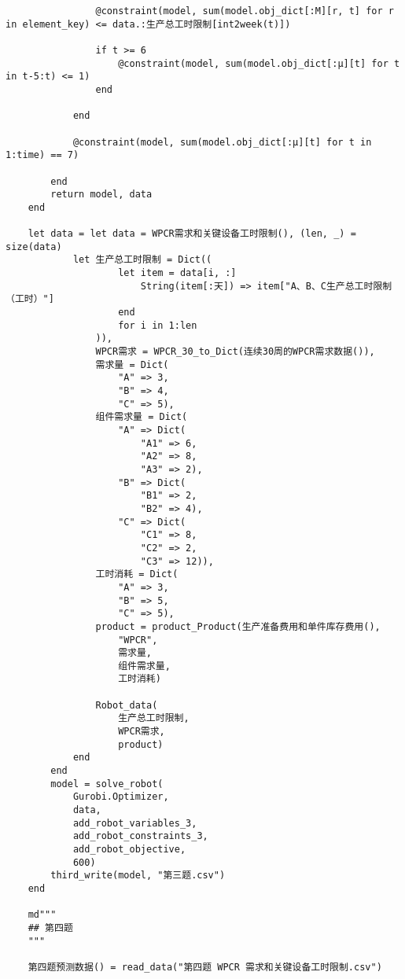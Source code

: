 \begin{appendices}
\begin{lstlisting}
                @constraint(model, sum(model.obj_dict[:M][r, t] for r in element_key) <= data.:生产总工时限制[int2week(t)])

                if t >= 6
                    @constraint(model, sum(model.obj_dict[:μ][t] for t in t-5:t) <= 1)
                end

            end

            @constraint(model, sum(model.obj_dict[:μ][t] for t in 1:time) == 7)

        end
        return model, data
    end

    let data = let data = WPCR需求和关键设备工时限制(), (len, _) = size(data)
            let 生产总工时限制 = Dict((
                    let item = data[i, :]
                        String(item[:天]) => item["A、B、C生产总工时限制（工时）"]
                    end
                    for i in 1:len
                )),
                WPCR需求 = WPCR_30_to_Dict(连续30周的WPCR需求数据()),
                需求量 = Dict(
                    "A" => 3,
                    "B" => 4,
                    "C" => 5),
                组件需求量 = Dict(
                    "A" => Dict(
                        "A1" => 6,
                        "A2" => 8,
                        "A3" => 2),
                    "B" => Dict(
                        "B1" => 2,
                        "B2" => 4),
                    "C" => Dict(
                        "C1" => 8,
                        "C2" => 2,
                        "C3" => 12)),
                工时消耗 = Dict(
                    "A" => 3,
                    "B" => 5,
                    "C" => 5),
                product = product_Product(生产准备费用和单件库存费用(),
                    "WPCR",
                    需求量,
                    组件需求量,
                    工时消耗)

                Robot_data(
                    生产总工时限制,
                    WPCR需求,
                    product)
            end
        end
        model = solve_robot(
            Gurobi.Optimizer,
            data,
            add_robot_variables_3,
            add_robot_constraints_3,
            add_robot_objective,
            600)
        third_write(model, "第三题.csv")
    end

    md"""
    ## 第四题
    """

    第四题预测数据() = read_data("第四题 WPCR 需求和关键设备工时限制.csv")


\end{lstlisting}
\end{appendices}
